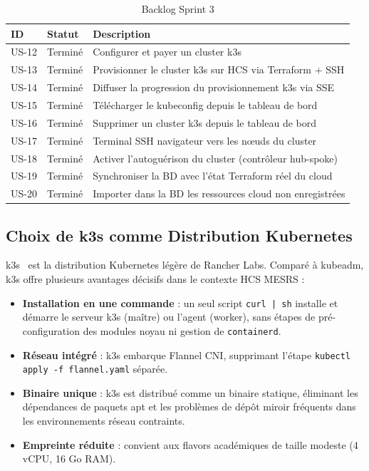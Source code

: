 \begin{table}[H]
\centering
\caption{Backlog Sprint 3}
\label{tab:sprint3_backlog}
\begin{tabularx}{\linewidth}{llX}
\toprule
\textbf{ID} & \textbf{Statut} & \textbf{Description} \\
\midrule
US-12 & Terminé & Configurer et payer un cluster k3s \\
US-13 & Terminé & Provisionner le cluster k3s sur HCS via Terraform + SSH \\
US-14 & Terminé & Diffuser la progression du provisionnement k3s via SSE \\
US-15 & Terminé & Télécharger le kubeconfig depuis le tableau de bord \\
US-16 & Terminé & Supprimer un cluster k3s depuis le tableau de bord \\
US-17 & Terminé & Terminal SSH navigateur vers les nœuds du cluster \\
US-18 & Terminé & Activer l'autoguérison du cluster (contrôleur hub-spoke) \\
US-19 & Terminé & Synchroniser la BD avec l'état Terraform réel du cloud \\
US-20 & Terminé & Importer dans la BD les ressources cloud non enregistrées \\
\bottomrule
\end{tabularx}
\end{table}

\subsection{Choix de k3s comme Distribution Kubernetes}

k3s~\cite{k3s_docs} est la distribution Kubernetes légère de Rancher Labs.
Comparé à kubeadm, k3s offre plusieurs avantages décisifs dans le contexte HCS MESRS :

\begin{itemize}
  \item \textbf{Installation en une commande} : un seul script \texttt{curl | sh}
        installe et démarre le serveur k3s (maître) ou l'agent (worker), sans étapes
        de pré-configuration des modules noyau ni gestion de \texttt{containerd}.
  \item \textbf{Réseau intégré} : k3s embarque Flannel CNI, supprimant l'étape
        \texttt{kubectl apply -f flannel.yaml} séparée.
  \item \textbf{Binaire unique} : k3s est distribué comme un binaire statique,
        éliminant les dépendances de paquets apt et les problèmes de dépôt miroir
        fréquents dans les environnements réseau contraints.
  \item \textbf{Empreinte réduite} : convient aux flavors académiques de taille
        modeste (4 vCPU, 16 Go RAM).
\end{itemize}

